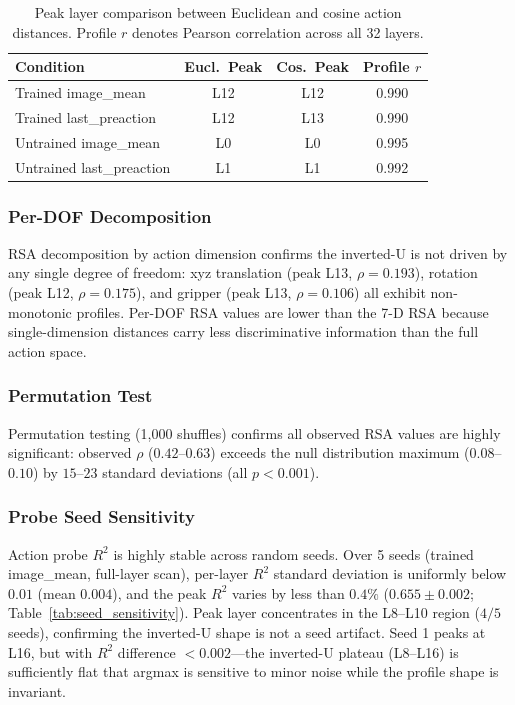 \begin{table}[h]
\centering
\caption{Peak layer comparison between Euclidean and cosine action distances. Profile $r$ denotes Pearson correlation across all 32 layers.}
\label{tab:metric_invariance}
\small
\begin{tabular}{lccc}
\toprule
Condition & Eucl.\ Peak & Cos.\ Peak & Profile $r$ \\
\midrule
Trained image\_mean & L12 & L12 & 0.990 \\
Trained last\_preaction & L12 & L13 & 0.990 \\
Untrained image\_mean & L0 & L0 & 0.995 \\
Untrained last\_preaction & L1 & L1 & 0.992 \\
\bottomrule
\end{tabular}
\end{table}

\subsubsection{Per-DOF Decomposition}
\label{sec:perdof}

RSA decomposition by action dimension confirms the inverted-U is not driven by any single degree of freedom: xyz translation (peak L13, $\rho = 0.193$), rotation (peak L12, $\rho = 0.175$), and gripper (peak L13, $\rho = 0.106$) all exhibit non-monotonic profiles.
Per-DOF RSA values are lower than the 7-D RSA because single-dimension distances carry less discriminative information than the full action space.

\subsubsection{Permutation Test}
\label{sec:permutation}

Permutation testing (1{,}000 shuffles) confirms all observed RSA values are highly significant: observed $\rho$ ($0.42$--$0.63$) exceeds the null distribution maximum ($0.08$--$0.10$) by $15$--$23$ standard deviations (all $p < 0.001$).

\subsubsection{Probe Seed Sensitivity}
\label{sec:seed_sensitivity}

Action probe $R^2$ is highly stable across random seeds.
Over 5 seeds (trained image\_mean, full-layer scan), per-layer $R^2$ standard deviation is uniformly below $0.01$ (mean $0.004$), and the peak $R^2$ varies by less than $0.4\%$ ($0.655 \pm 0.002$; Table~\ref{tab:seed_sensitivity}).
Peak layer concentrates in the L8--L10 region ($4/5$ seeds), confirming the inverted-U shape is not a seed artifact.
Seed 1 peaks at L16, but with $R^2$ difference ${<}0.002$---the inverted-U plateau (L8--L16) is sufficiently flat that argmax is sensitive to minor noise while the profile shape is invariant.

